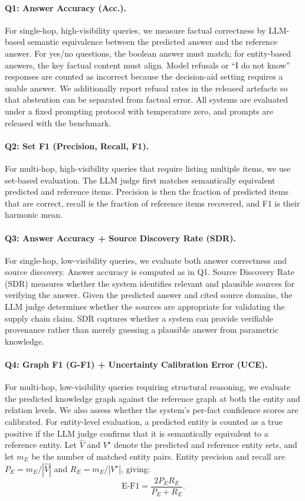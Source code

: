 \documentclass{article}
\begin{document}
\paragraph{Q1: Answer Accuracy (Acc.).}
For single-hop, high-visibility queries, we measure factual correctness by LLM-based semantic equivalence between the predicted answer and the reference answer. For yes/no questions, the boolean answer must match; for entity-based answers, the key factual content must align. Model refusals or ``I do not know'' responses are counted as incorrect because the decision-aid setting requires a usable answer. We additionally report refusal rates in the released artefacts so that abstention can be separated from factual error. All systems are evaluated under a fixed prompting protocol with temperature zero, and prompts are released with the benchmark.

\paragraph{Q2: Set F1 (Precision, Recall, F1).}
For multi-hop, high-visibility queries that require listing multiple items, we use set-based evaluation. The LLM judge first matches semantically equivalent predicted and reference items. Precision is then the fraction of predicted items that are correct, recall is the fraction of reference items recovered, and F1 is their harmonic mean.

\paragraph{Q3: Answer Accuracy + Source Discovery Rate (SDR).}
For single-hop, low-visibility queries, we evaluate both answer correctness and source discovery. Answer accuracy is computed as in Q1. Source Discovery Rate (SDR) measures whether the system identifies relevant and plausible sources for verifying the answer. Given the predicted answer and cited source domains, the LLM judge determines whether the sources are appropriate for validating the supply chain claim. SDR captures whether a system can provide verifiable provenance rather than merely guessing a plausible answer from parametric knowledge.

\paragraph{Q4: Graph F1 (G-F1) + Uncertainty Calibration Error (UCE).}
For multi-hop, low-visibility queries requiring structural reasoning, we evaluate the predicted knowledge graph against the reference graph at both the entity and relation levels. We also assess whether the system's per-fact confidence scores are calibrated.
For entity-level evaluation, a predicted entity is counted as a true positive if the LLM judge confirms that it is semantically equivalent to a reference entity. Let $\hat{V}$ and $V^\star$ denote the predicted and reference entity sets, and let $m_E$ be the number of matched entity pairs. Entity precision and recall are $P_E=m_E/|\hat{V}|$ and $R_E=m_E/|V^\star|$, giving:
\begin{equation}
\text{E-F1}
=
\frac{2P_E R_E}{P_E + R_E}.
\end{equation}
\end{document}
